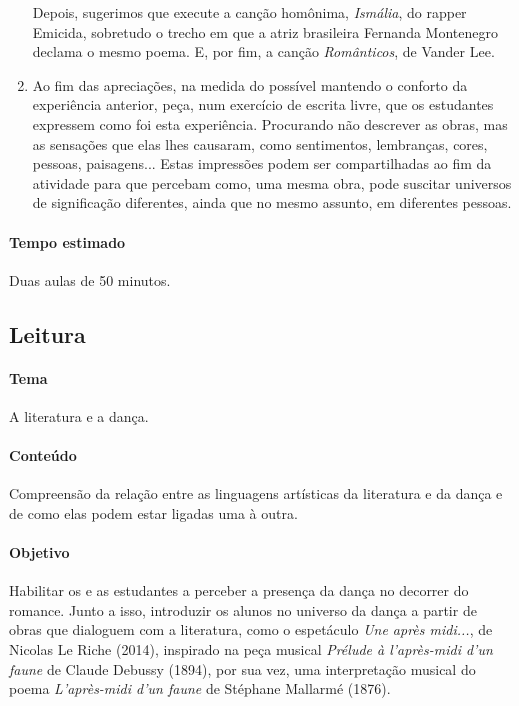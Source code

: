 \documentclass[12pt]{extarticle}
\begin{document}
\begin{enumerate}
  Depois, sugerimos que execute a canção homônima, \textit{Ismália}, do rapper Emicida,
  sobretudo o trecho em que a atriz brasileira Fernanda Montenegro declama
  o mesmo poema. E, por fim, a canção \textit{Românticos}, de Vander Lee.

  \item
  Ao fim das apreciações, na medida do possível mantendo o conforto
  da experiência anterior, peça, num exercício de escrita livre,
  que os estudantes expressem como foi esta experiência. Procurando
  não descrever as obras, mas as sensações que elas lhes causaram, 
  como sentimentos, lembranças, cores, pessoas, paisagens... 
  Estas impressões podem ser compartilhadas ao fim da atividade para 
  que percebam como, uma mesma obra, pode suscitar universos de
  significação diferentes, ainda que no mesmo assunto, em diferentes
  pessoas.

\end{enumerate}

\paragraph{Tempo estimado} Duas aulas de 50 minutos.


\subsection{Leitura}



\paragraph{Tema} A literatura e a dança.

\paragraph{Conteúdo} Compreensão da relação entre as linguagens artísticas
da literatura e da dança e de como elas podem estar ligadas uma à outra. 

\paragraph{Objetivo} Habilitar os e as estudantes a perceber a presença
da dança no decorrer do romance. Junto a isso, introduzir os alunos
no universo da dança a partir de obras que dialoguem com a literatura,
como o espetáculo \textit{Une après midi...}, de Nicolas Le Riche
(2014), inspirado na peça musical \textit{Prélude à l'après-midi
d'un faune} de Claude Debussy (1894), por sua
vez, uma interpretação musical do poema \textit{L'après-midi d'un faune} 
de Stéphane Mallarmé (1876).
\end{document}
